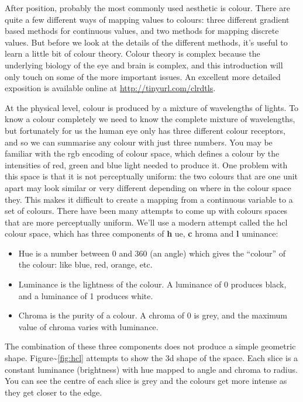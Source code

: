 After position, probably the most commonly used aesthetic is colour.
There are quite a few different ways of mapping values to colours: three
different gradient based methods for continuous values, and two methods
for mapping discrete values. But before we look at the details of the
different methods, it's useful to learn a little bit of colour theory.
Colour theory is complex because the underlying biology of the eye and
brain is complex, and this introduction will only touch on some of the
more important issues. An excellent more detailed exposition is
available online at \url{http://tinyurl.com/clrdtls}. 

At the physical level, colour is produced by a mixture of wavelengths of
lights. To know a colour completely we need to know the complete mixture
of wavelengths, but fortunately for us the human eye only has three
different colour receptors, and so we can summarise any colour with just
three numbers. You may be familiar with the rgb encoding of colour
space, which defines a colour by the intensities of red, green and blue
light needed to produce it. One problem with this space is that it is
not perceptually uniform: the two colours that are one unit apart may
look similar or very different depending on where in the colour space
they. This makes it difficult to create a mapping from a continuous
variable to a set of colours. There have been many attempts to come up
with colours spaces that are more perceptually uniform. We'll use a
modern attempt called the hcl colour space, which has three components
of \textbf{h} ue, \textbf{c} hroma and \textbf{l} uminance:

\begin{itemize}
\itemsep1pt\parskip0pt
\item
  Hue is a number between 0 and 360 (an angle) which gives the
  ``colour'' of the colour: like blue, red, orange, etc.
\item
  Luminance is the lightness of the colour. A luminance of 0 produces
  black, and a luminance of 1 produces white.
\item
  Chroma is the purity of a colour. A chroma of 0 is grey, and the
  maximum value of chroma varies with luminance.
\end{itemize}

The combination of these three components does not produce a simple
geometric shape. Figure\textasciitilde{}\ref{fig:hcl} attempts to show
the 3d shape of the space. Each slice is a constant luminance
(brightness) with hue mapped to angle and chroma to radius. You can see
the centre of each slice is grey and the colours get more intense as
they get closer to the edge.

